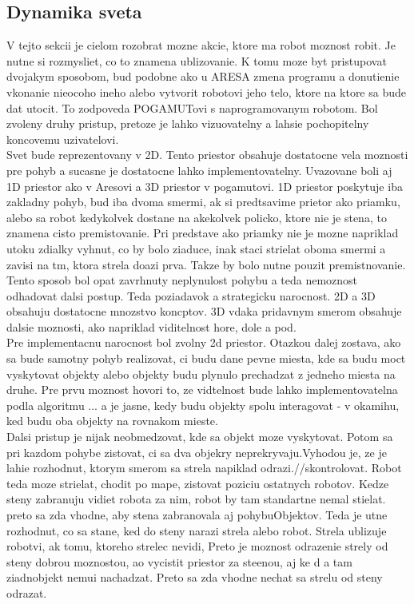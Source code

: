 \documentclass[a4paper,11pt,final]{report}
\begin{document}
\subsection{Dynamika sveta}
V tejto sekcii je cielom rozobrat mozne akcie, ktore ma robot moznost robit. Je nutne si rozmysliet, co to znamena ublizovanie. K tomu moze byt pristupovat dvojakym sposobom, bud podobne ako u ARESA zmena programu a donutienie vkonanie nieocoho ineho alebo vytvorit robotovi jeho telo, ktore na ktore sa bude dat utocit. To zodpoveda POGAMUTovi s naprogramovanym robotom. Bol zvoleny druhy pristup, pretoze je lahko vizuovatelny a lahsie pochopitelny koncovemu uzivatelovi.\\%
Svet bude reprezentovany v 2D. Tento priestor obsahuje  dostatocne vela moznosti pre pohyb a sucasne je dostatocne lahko implementovatelny. Uvazovane boli aj 1D priestor ako v Aresovi a 3D priestor v pogamutovi. 1D priestor poskytuje iba zakladny pohyb, bud iba dvoma smermi, ak si predtsavime prietor ako priamku, alebo sa robot kedykolvek dostane na akekolvek policko, ktore nie je stena, to znamena cisto premistovanie. Pri predstave ako priamky nie je mozne napriklad utoku zdialky vyhnut, co by bolo ziaduce, inak staci strielat oboma smermi a zavisi na tm, ktora strela doazi prva. Takze by bolo nutne pouzit premistnovanie. Tento sposob bol opat zavrhnuty neplynulost pohybu a teda nemoznost odhadovat dalsi postup. Teda poziadavok a strategicku narocnost. 2D a 3D obsahuju dostatocne mnozstvo koncptov. 3D vdaka pridavnym smerom obsahuje dalsie moznosti, ako napriklad viditelnost hore, dole a pod. \\
Pre implementacnu narocnost bol zvolny 2d priestor. Otazkou dalej zostava, ako sa bude samotny pohyb realizovat, ci budu dane pevne miesta, kde sa budu moct vyskytovat objekty alebo objekty budu plynulo prechadzat z jedneho miesta na druhe. Pre prvu moznost hovori to, ze vidtelnost bude lahko implementovatelna podla algoritmu ... a je jasne, kedy budu objekty spolu interagovat - v okamihu, ked budu oba objekty na rovnakom mieste. \\
Dalsi pristup je nijak neobmedzovat, kde sa objekt moze vyskytovat. Potom sa pri kazdom pohybe zistovat, ci sa dva objekry neprekryvaju.Vyhodou je, ze je lahie rozhodnut, ktorym smerom sa strela napiklad odrazi.//skontrolovat.
Robot teda moze strielat, chodit po mape, zistovat poziciu ostatnych robotov. Kedze steny zabranuju vidiet robota za nim, robot by tam standartne nemal stielat. preto sa zda vhodne, aby stena zabranovala aj pohybuObjektov. Teda je utne rozhodnut, co sa stane, ked do steny narazi strela alebo robot. Strela ublizuje robotvi, ak tomu, ktoreho strelec nevidi, Preto je moznost odrazenie strely od steny dobrou moznostou, ao vycistit priestor za steenou, aj ke d a tam ziadnobjekt nemui nachadzat. Preto sa zda vhodne nechat sa strelu od steny odrazat.\\
\end{document}
